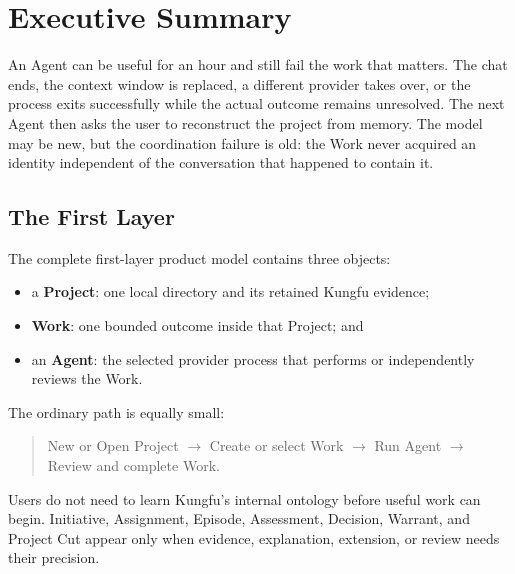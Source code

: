 \section{Executive Summary}

An Agent can be useful for an hour and still fail the work that matters. The
chat ends, the context window is replaced, a different provider takes over, or
the process exits successfully while the actual outcome remains unresolved.
The next Agent then asks the user to reconstruct the project from memory. The
model may be new, but the coordination failure is old: the Work never acquired
an identity independent of the conversation that happened to contain it.


\subsection{The First Layer}

The complete first-layer product model contains three objects:

\begin{itemize}[leftmargin=*]
  \item a \textbf{Project}: one local directory and its retained Kungfu
  evidence;
  \item \textbf{Work}: one bounded outcome inside that Project; and
  \item an \textbf{Agent}: the selected provider process that performs or
  independently reviews the Work.
\end{itemize}

The ordinary path is equally small:

\begin{quote}
New or Open Project $\rightarrow$ Create or select Work $\rightarrow$ Run
Agent $\rightarrow$ Review and complete Work.
\end{quote}

Users do not need to learn Kungfu's internal ontology before useful work can
begin. Initiative, Assignment, Episode, Assessment, Decision, Warrant, and
Project Cut appear only when evidence, explanation, extension, or review needs
their precision.

